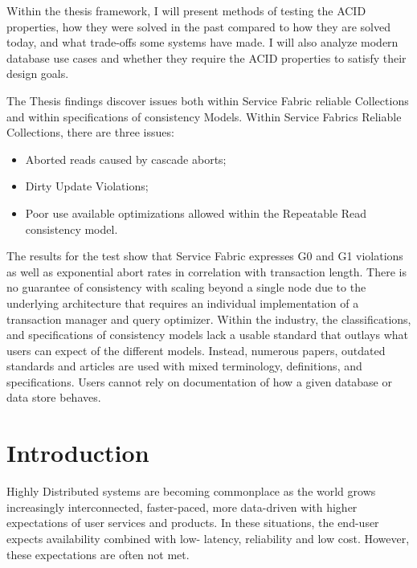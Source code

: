 \documentclass[a4paper,10pt,titlepage]{report}
\begin{document}
    Within the thesis framework, I will present methods of testing the ACID properties, how they were solved in the past compared to how they are solved today, and what trade-offs some systems have made. I will also analyze modern database use cases and whether they require the ACID properties to satisfy their design goals.\\
    \vspace{5mm}


    The Thesis findings discover issues both within Service Fabric reliable Collections and within specifications of consistency Models. 
    Within Service Fabrics Reliable Collections, there are three issues: 
    \begin{itemize}
    \item Aborted reads caused by cascade aborts;
    \item Dirty Update Violations;
    \item Poor use available optimizations allowed within the Repeatable Read consistency model. 
    \end{itemize}
    
    The results for the test show that Service Fabric expresses G0 and G1 violations as well as exponential abort rates in correlation with transaction length. There is no guarantee of consistency with scaling beyond a single node due to the underlying architecture that requires an individual implementation of a transaction manager and query optimizer.
    Within the industry, the classifications, and specifications of consistency models lack a usable standard that outlays what users can expect of the different models.
    Instead, numerous papers, outdated standards and articles are used with mixed terminology, definitions, and specifications. Users cannot rely on documentation of how a given database or data store behaves.



    \chapter{Introduction}
    Highly Distributed systems are becoming commonplace as the world grows increasingly interconnected, faster-paced, more data-driven with higher expectations of user services and products. In these situations, the end-user expects availability combined with low- latency, reliability and low cost. However, these expectations are often not met.
\end{document}
